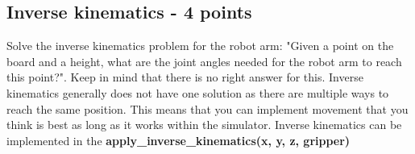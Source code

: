 \documentclass{article}
\begin{document}
\subsection*{Inverse kinematics - 4 points}
Solve the inverse kinematics problem for the robot arm: "Given a point on the board and a height, what are the joint angles needed for the robot arm to reach this point?". Keep in mind that there is no right answer for this. Inverse kinematics generally does not have one solution as there are multiple ways to reach the same position. This means that you can implement movement that you think is best as long as it works within the simulator. Inverse kinematics can be implemented in the \textbf{apply\_inverse\_kinematics(x, y, z, gripper)}
\end{document}
